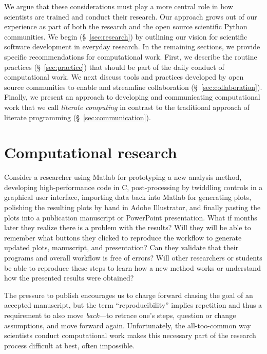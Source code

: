 \documentclass[11pt,oneside,english]{article}
\begin{document}
We argue that these considerations must play a more central role in how
scientists are trained and conduct their research. Our approach grows out of
our experience as part of both the research and the open source scientific
Python communities.  We begin (§~\ref{sec:research}) by outlining our vision
for scientific software development in everyday research. In the remaining
sections, we provide specific recommendations for computational work.  First,
we describe the routine practices (§~\ref{sec:practice}) that should be part of
the daily conduct of computational work. We next discuss tools and practices
developed by open source communities to enable and streamline collaboration
(§~\ref{sec:collaboration}). Finally, we present an approach to developing and
communicating computational work that we call \emph{literate computing} in
contrast to the traditional approach of literate programming
(§~\ref{sec:communication}).

\section{\label{sec:research}Computational research}

Consider a researcher using Matlab for prototyping a new analysis method,
developing high-performance code in C, post-processing by twiddling controls in
a graphical user interface, importing data back into Matlab for
generating plots, polishing the resulting plots by hand in Adobe Illustrator,
and finally pasting the plots into a publication manuscript or PowerPoint
presentation. What if months later they realize there is a problem with the
results? Will they will be able to remember what buttons they clicked to
reproduce the workflow to generate updated plots, manuscript, and presentation?
Can they validate that their programs and overall workflow is free of errors?
Will other researchers or students be able to reproduce these steps to learn
how a new method works or understand how the presented results were obtained?

The pressure to publish encourages us to charge forward chasing the goal of an
accepted manuscript, but the term ``reproducibility'' implies repetition and
thus a requirement to also move \emph{back}---to retrace one's steps, question
or change assumptions, and move forward again. Unfortunately, the
all-too-common way scientists conduct computational work makes this necessary
part of the research process difficult at best, often impossible.
\end{document}
